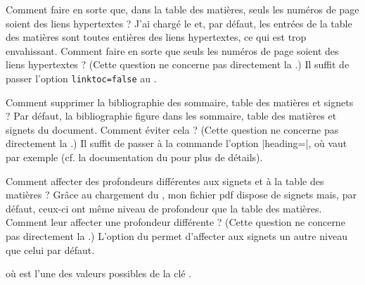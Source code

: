 \begin{dbfaq}{Comment faire en sorte que, dans la table des matières, seuls
    les numéros de page soient des liens hypertextes ?}{}
  J'ai chargé le  et, par défaut, les entrées de la table des
  matières sont toutes entières des liens hypertextes, ce qui est trop
  envahissant. Comment faire en sorte que seuls les numéros de page soient des
  liens hypertextes ?
  \tcblower
  (Cette question ne concerne pas directement la \yatCl{}.) Il suffit de passer
  l'option \lstinline|linktoc=false| au .
\end{dbfaq}

\begin{dbfaq}{Comment supprimer la bibliographie des sommaire, table des
    matières et signets ?}{}
  Par défaut, la bibliographie figure dans les sommaire, table des matières et
  signets du document. Comment éviter cela ?
  \tcblower
  (Cette question ne concerne pas directement la \yatCl{}.) Il suffit de passer
  à la commande  l'option
  |heading=|, où  vaut par exemple
   (cf. la documentation du  pour plus
  de détails).
\end{dbfaq}

\begin{dbfaq}{Comment affecter des profondeurs différentes aux signets et à la
    table des matières ?}{}
  Grâce au chargement du , mon fichier \acrshort{pdf} dispose
  de signets mais, par défaut, ceux-ci ont même niveau de profondeur que la
  table des matières. Comment leur affecter une profondeur différente ?
  \tcblower
  (Cette question ne concerne pas directement la \yatCl{}.) L'option
   du  permet d'affecter aux signets un
  autre niveau que celui par défaut.
\begin{preamblecode}[title=Par exemple dans le \File{\configurationfile}]
\end{preamblecode}
où  est l'une des valeurs possibles de la clé
.
\end{dbfaq}

